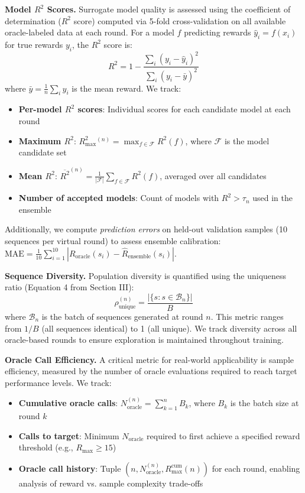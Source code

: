 \textbf{Model $R^2$ Scores.} Surrogate model quality is assessed using the coefficient of determination ($R^2$ score) computed via 5-fold cross-validation on all available oracle-labeled data at each round. For a model $f$ predicting rewards $\hat{y}_i = f(x_i)$ for true rewards $y_i$, the $R^2$ score is:
%
\begin{equation}
R^2 = 1 - \frac{\sum_{i}(y_i - \hat{y}_i)^2}{\sum_{i}(y_i - \bar{y})^2}
\end{equation}
%
where $\bar{y} = \frac{1}{n}\sum_{i}y_i$ is the mean reward. We track:
\begin{itemize}
    \item \textbf{Per-model $R^2$ scores}: Individual scores for each candidate model at each round
    \item \textbf{Maximum $R^2$}: $R^2_{\max}^{(n)} = \max_{f \in \mathcal{F}} R^2(f)$, where $\mathcal{F}$ is the model candidate set
    \item \textbf{Mean $R^2$}: $\overline{R^2}^{(n)} = \frac{1}{|\mathcal{F}|}\sum_{f \in \mathcal{F}} R^2(f)$, averaged over all candidates
    \item \textbf{Number of accepted models}: Count of models with $R^2 > \tau_n$ used in the ensemble
\end{itemize}

Additionally, we compute \textit{prediction errors} on held-out validation samples (10 sequences per virtual round) to assess ensemble calibration: $\text{MAE} = \frac{1}{10}\sum_{i=1}^{10}|R_{\text{oracle}}(s_i) - \hat{R}_{\text{ensemble}}(s_i)|$.

\textbf{Sequence Diversity.} Population diversity is quantified using the uniqueness ratio (Equation 4 from Section III):
%
\begin{equation}
\rho_{\text{unique}}^{(n)} = \frac{|\{s : s \in \mathcal{B}_n\}|}{B}
\end{equation}
%
where $\mathcal{B}_n$ is the batch of sequences generated at round $n$. This metric ranges from $1/B$ (all sequences identical) to 1 (all unique). We track diversity across all oracle-based rounds to ensure exploration is maintained throughout training.

\textbf{Oracle Call Efficiency.} A critical metric for real-world applicability is sample efficiency, measured by the number of oracle evaluations required to reach target performance levels. We track:
\begin{itemize}
    \item \textbf{Cumulative oracle calls}: $N_{\text{oracle}}^{(n)} = \sum_{k=1}^{n} B_k$, where $B_k$ is the batch size at round $k$
    \item \textbf{Calls to target}: Minimum $N_{\text{oracle}}$ required to first achieve a specified reward threshold (e.g., $R_{\max} \geq 15$)
    \item \textbf{Oracle call history}: Tuple $(n, N_{\text{oracle}}^{(n)}, R_{\max}^{\text{cum}}(n))$ for each round, enabling analysis of reward vs. sample complexity trade-offs
\end{itemize}

